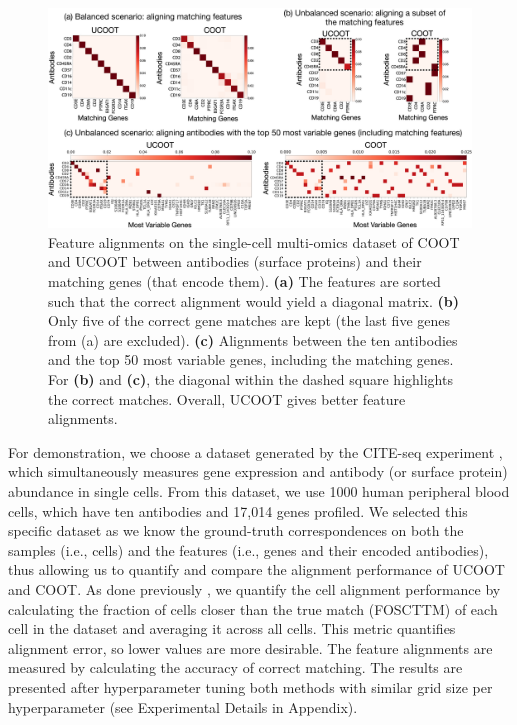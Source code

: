\begin{figure}
    \centering
    \includegraphics[trim={0.2cm 0.2cm 0.8cm 0.5cm}, clip, width=\linewidth, keepaspectratio=true]{./Chapitre3/fig/genes-alignments.pdf}
    \caption{Feature alignments on the single-cell multi-omics dataset of COOT and UCOOT between antibodies (surface proteins) and their matching genes (that encode them). \textbf{(a)} The features are sorted such that the correct alignment would yield a diagonal matrix. \textbf{(b)} Only five of the correct gene matches are kept (the last five genes from (a) are excluded). \textbf{(c)} Alignments between the ten antibodies and the top 50 most variable genes, including the matching genes.
    For \textbf{(b)} and \textbf{(c)}, the diagonal within the dashed square highlights the correct matches.
    Overall, UCOOT gives better feature alignments.
    \label{fig:multiomics}}
\end{figure}

For demonstration, we choose a dataset generated by the CITE-seq experiment \citep{CITEseq},
which simultaneously measures gene expression and antibody (or surface protein)
abundance in single cells. From this dataset, we use 1000 human peripheral blood cells,
which have ten antibodies and 17,014 genes profiled. We selected this specific dataset
as we know the ground-truth correspondences on both the samples (i.e., cells)
and the features (i.e., genes and their encoded antibodies), thus allowing us to quantify
and compare the alignment performance of UCOOT and COOT.
As done previously \citep{Pamona, Demetci22, Liu2019}, we quantify the cell alignment performance
by calculating the fraction of cells closer than the true match (FOSCTTM) of each cell
in the dataset and averaging it across all cells. This metric quantifies alignment error,
so lower values are more desirable. The feature alignments are measured by calculating
the accuracy of correct matching. The results are presented after hyperparameter tuning
both methods with similar grid size per hyperparameter (see Experimental Details in Appendix).


